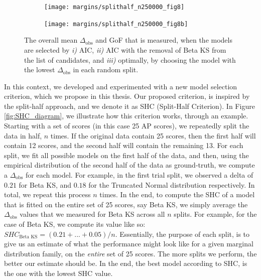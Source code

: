 \begin{figure}[t]
	\begin{subfigure}{1\textwidth}
		\centering
		\texttt{[image: margins/splithalf\_n250000\_fig8]}
	\end{subfigure} \newline
	\begin{subfigure}{1\textwidth}
		\texttt{[image: margins/splithalf\_n250000\_fig8b]}
	\end{subfigure}
	\caption{The overall mean $\Delta_{\text{obs}}$ and GoF that is measured, when the models are selected by \textit{i)} AIC, \textit{ii)} AIC with the removal of Beta KS from the list of candidates, and \textit{iii)} optimally, by choosing the model with the lowest $\Delta_{\text{obs}}$ in each random split.}
\label{fig:margins-splithalf-plot-8}
\end{figure}

In this context, we developed and experimented with a new model selection criterion, which we propose in this thesis. Our proposed criterion, is inspired by the split-half approach, and we denote it as SHC (Split-Half Criterion). In Figure \ref{fig:SHC_diagram}, we illustrate how this criterion works, through an example. Starting with a set of scores (in this case 25 AP scores), we repeatedly split the data in half, $n$ times. If the original data contain 25 scores, then the first half will contain 12 scores, and the second half will contain the remaining 13. For each split, we fit all possible models on the first half of the data, and then, using the empirical distribution of the second half of the data as ground-truth, we compute a $\Delta_{\text{obs}}$ for each model. For example, in the first trial split, we observed a delta of $0.21$ for Beta KS, and $0.18$ for the Truncated Normal distribution respectively. In total, we repeat this process $n$ times. In the end, to compute the SHC of a model that is fitted on the entire set of 25 scores, say Beta KS, we simply average the $\Delta_{\text{obs}}$ values that we measured for Beta KS across all $n$ splits. For example, for the case of Beta KS, we compute its value like so: $SHC_{\text{Beta  KS}}=\left(0.21+...+0.05\right)/n$. Essentially, the purpose of each split, is to give us an estimate of what the performance might look like for a given marginal distribution family, on the \textit{entire} set of 25 scores. The more splits we perform, the better our estimate should be. In the end, the best model according to SHC, is the one with the lowest SHC value.

